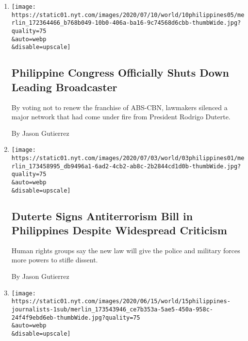 \begin{enumerate}
\def\labelenumi{\arabic{enumi}.}
\item
  \href{/2020/07/10/world/asia/philippines-congress-media-duterte-abs-cbn.html}{}

  \texttt{[image: https://static01.nyt.com/images/2020/07/10/world/10philippines05/merlin\_172364466\_b768b049-10b0-406a-ba16-9c74568d6cbb-thumbWide.jpg?quality=75\\\&auto=webp\\\&disable=upscale]}

  \hypertarget{philippine-congress-officially-shuts-down-leading-broadcaster}{%
  \subsection{Philippine Congress Officially Shuts Down Leading
  Broadcaster}\label{philippine-congress-officially-shuts-down-leading-broadcaster}}

  By voting not to renew the franchise of ABS-CBN, lawmakers silenced a
  major network that had come under fire from President Rodrigo Duterte.

  By Jason Gutierrez
\item
  \href{/2020/07/03/world/asia/duterte-antiterrorism-law-philippines.html}{}

  \texttt{[image: https://static01.nyt.com/images/2020/07/03/world/03philippines01/merlin\_173458995\_db9496a1-6ad2-4cb2-ab8c-2b2844cd1d0b-thumbWide.jpg?quality=75\\\&auto=webp\\\&disable=upscale]}

  \hypertarget{duterte-signs-antiterrorism-bill-in-philippines-despite-widespread-criticism}{%
  \subsection{Duterte Signs Antiterrorism Bill in Philippines Despite
  Widespread
  Criticism}\label{duterte-signs-antiterrorism-bill-in-philippines-despite-widespread-criticism}}

  Human rights groups say the new law will give the police and military
  forces more powers to stifle dissent.

  By Jason Gutierrez
\item
  \href{/2020/06/14/business/maria-ressa-verdict-philippines-rappler.html}{}

  \texttt{[image: https://static01.nyt.com/images/2020/06/15/world/15philippines-journalists-1sub/merlin\_173543946\_ce7b353a-5ae5-450a-958c-24f4f9ebd6eb-thumbWide.jpg?quality=75\\\&auto=webp\\\&disable=upscale]}

  \hypertarget{maria-ressa-crusading-journalist-is-convicted-in-philippines-libel-case}{%
}
\end{enumerate}
